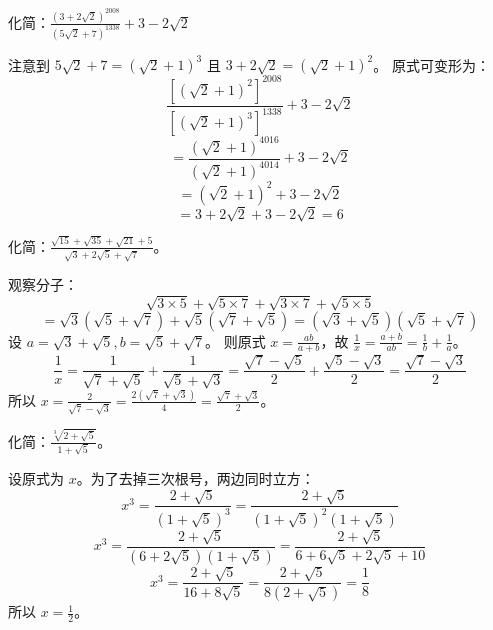 \begin{questions}
\question 化简：$\frac{\left(3+2\sqrt{2}\right)^{2008}}{\left(5\sqrt{2}+7\right)^{1338}} + 3 - 2\sqrt{2}$

\begin{solution}
注意到 $5\sqrt{2}+7 = \left(\sqrt{2}+1\right)^3$ 且 $3+2\sqrt{2} = \left(\sqrt{2}+1\right)^2$。
原式可变形为：
\[
\frac{\left[\left(\sqrt{2}+1\right)^2\right]^{2008}}{\left[\left(\sqrt{2}+1\right)^3\right]^{1338}} + 3 - 2\sqrt{2}
\]
\[
= \frac{\left(\sqrt{2}+1\right)^{4016}}{\left(\sqrt{2}+1\right)^{4014}} + 3 - 2\sqrt{2}
\]
\[
= \left(\sqrt{2}+1\right)^2 + 3 - 2\sqrt{2}
\]
\[
= 3 + 2\sqrt{2} + 3 - 2\sqrt{2} = 6
\]
\end{solution}

\question 化简：$\frac{\sqrt{15} + \sqrt{35} + \sqrt{21} + 5}{\sqrt{3} + 2\sqrt{5} + \sqrt{7}}$。

\begin{solution}
观察分子：
\[
\sqrt{3 \times 5} + \sqrt{5 \times 7} + \sqrt{3 \times 7} + \sqrt{5 \times 5}
\]
\[
= \sqrt{3}(\sqrt{5} + \sqrt{7}) + \sqrt{5}(\sqrt{7} + \sqrt{5}) = (\sqrt{3} + \sqrt{5})(\sqrt{5} + \sqrt{7})
\]
设 $a = \sqrt{3} + \sqrt{5}, b = \sqrt{5} + \sqrt{7}$。
则原式 $x = \frac{ab}{a + b}$，故 $\frac{1}{x} = \frac{a + b}{ab} = \frac{1}{b} + \frac{1}{a}$。
\[
\frac{1}{x} = \frac{1}{\sqrt{7} + \sqrt{5}} + \frac{1}{\sqrt{5} + \sqrt{3}} = \frac{\sqrt{7} - \sqrt{5}}{2} + \frac{\sqrt{5} - \sqrt{3}}{2} = \frac{\sqrt{7} - \sqrt{3}}{2}
\]
所以 $x = \frac{2}{\sqrt{7} - \sqrt{3}} = \frac{2(\sqrt{7} + \sqrt{3})}{4} = \frac{\sqrt{7} + \sqrt{3}}{2}$。
\end{solution}

\question 化简：$\frac{\sqrt[3]{2 + \sqrt{5}}}{1 + \sqrt{5}}$。

\begin{solution}
设原式为 $x$。为了去掉三次根号，两边同时立方：
\[
x^3 = \frac{2 + \sqrt{5}}{(1 + \sqrt{5})^3} = \frac{2 + \sqrt{5}}{(1 + \sqrt{5})^2(1 + \sqrt{5})}
\]
\[
x^3 = \frac{2 + \sqrt{5}}{(6 + 2\sqrt{5})(1 + \sqrt{5})} = \frac{2 + \sqrt{5}}{6 + 6\sqrt{5} + 2\sqrt{5} + 10}
\]
\[
x^3 = \frac{2 + \sqrt{5}}{16 + 8\sqrt{5}} = \frac{2 + \sqrt{5}}{8(2 + \sqrt{5})} = \frac{1}{8}
\]
所以 $x = \frac{1}{2}$。
\end{solution}


\end{questions}
